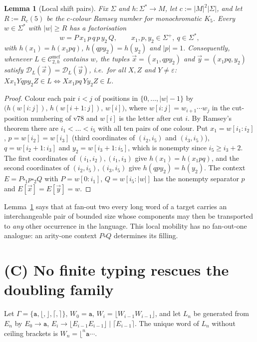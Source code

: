 \documentclass[11pt]{article}
\newtheorem{lemma}[theorem]{Lemma}
\theoremstyle{definition}
\theoremstyle{remark}
\newcommand{\Cmcf}[2]{\mathcal{C}^{\mathrm{mcf}}_{#1,#2}}
\newcommand{\D}{\mathcal{D}}
\newcommand{\tuple}[1]{\vec{#1}}
\newcommand{\blank}{\square}
\newcommand{\eps}{\varepsilon}
\newcommand{\fl}{\lfloor}
\newcommand{\fr}{\rfloor}
\newcommand{\cl}{\lceil}
\newcommand{\cri}{\rceil}
\begin{document}
\begin{lemma}[Local shift pairs]\label{lem:local-shift}
Fix $\Sigma$ and $h:\Sigma^*\to M$, let $c:=|M|^2|\Sigma|$, and let
$R:=R_c(5)$ be the $c$-colour Ramsey number for monochromatic $K_5$.
Every $w\in\Sigma^*$ with $|w|\ge R$ has a factorisation
\[
 w=P\,x_1\,p\,q\,p\,y_2\,Q,\qquad x_1,p,y_2\in\Sigma^+,\ q\in\Sigma^*,
\]
with $h(x_1)=h(x_1pq)$, $h(qpy_2)=h(y_2)$ and $|p|=1$.  Consequently,
whenever $L\in\Cmcf{2}{h}$ contains $w$, the tuples
$\tuple x=(x_1,qpy_2)$ and $\tuple y=(x_1pq,y_2)$ satisfy
$\D_L(\tuple x)=\D_L(\tuple y)$, i.e.\ for all $X,Z$ and $Y\ne\eps$:
$X x_1 Y qpy_2 Z\in L\iff X x_1pq\, Y y_2 Z\in L$.
\end{lemma}
\begin{proof}
Colour each pair $i<j$ of positions in $\{0,\ldots,|w|-1\}$ by
$\bigl(h(w[i{:}j]),\,h(w[i{+}1{:}j]),\,w[i]\bigr)$, where
$w[i{:}j]=w_{i+1}\cdots w_j$ in the cut-position numbering of v78 and
$w[i]$ is the letter after cut $i$.  By Ramsey's theorem there are
$i_1<\dots<i_5$ with all ten pairs of one colour.  Put
$x_1=w[i_1{:}i_2]$, $p=w[i_2]=w[i_3]$ (third coordinates of
$(i_2,i_5)$ and $(i_3,i_5)$), $q=w[i_2{+}1{:}i_3]$ and
$y_2=w[i_3{+}1{:}i_5]$, which is nonempty since $i_5\ge i_3+2$.  The first
coordinates of $(i_1,i_2),(i_1,i_3)$ give $h(x_1)=h(x_1pq)$, and the second
coordinates of $(i_2,i_5),(i_3,i_5)$ give $h(qpy_2)=h(y_2)$.  The context
$E=P\blank_1 p\blank_2 Q$ with $P=w[0{:}i_1]$, $Q=w[i_5{:}|w|]$ has the
nonempty separator $p$ and $E[\tuple x]=E[\tuple y]=w$.
\end{proof}

Lemma~\ref{lem:local-shift} says that at fan-out two every long word of a
target carries an interchangeable pair of bounded size whose components
may then be transported to \emph{any} other occurrence in the language.
This local mobility has no fan-out-one analogue: an arity-one context
$P\blank Q$ determines its filling.

\section{(C) No finite typing rescues the doubling family}

Let $\Gamma=\{\mathtt a,\fl,\fr,\cl,\cri\}$, $W_0=\mathtt a$,
$W_i=\fl W_{i-1}W_{i-1}\fr$, and let $L_n$ be generated from $E_n$ by
$E_0\to\mathtt a$, $E_i\to\fl E_{i-1}E_{i-1}\fr\mid\cl E_{i-1}\cri$.  The
unique word of $L_n$ without ceiling brackets is $W_n=\fl^n\mathtt a\cdots$.
\end{document}

